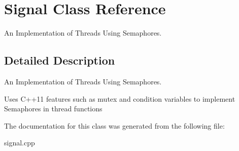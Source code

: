 \hypertarget{classSignal}{}\section{Signal Class Reference}
\label{classSignal}


An Implementation of Threads Using Semaphores.  




\subsection{Detailed Description}
An Implementation of Threads Using Semaphores. 

Uses C++11 features such as mutex and condition variables to implement Semaphores in thread functions 

The documentation for this class was generated from the following file\+:\begin{DoxyCompactItemize}
\item 
signal.\+cpp\end{DoxyCompactItemize}
